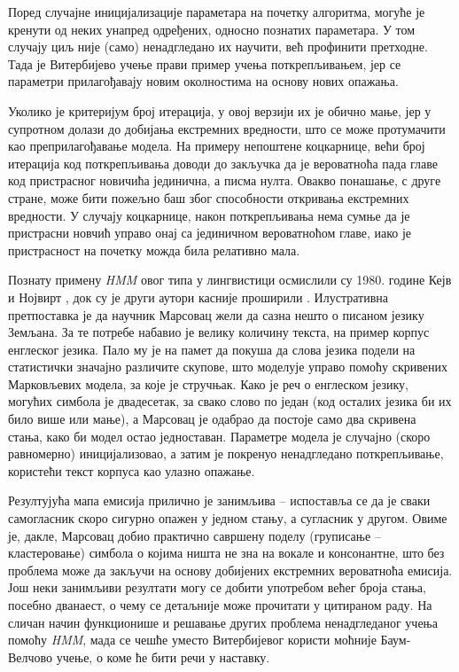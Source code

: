 \documentclass[12pt,oneside]{memoir}
\begin{document}
\begin{CJK}{UTF8}{ipxm}
Поред случајне иницијализације параметара на почетку алгоритма, могуће је кренути од неких унапред одређених, односно познатих параметара. У том случају циљ није (само) ненадгледано их научити, већ профинити претходне. Тада је Витербијево учење прави пример учења поткрепљивањем, јер се параметри прилагођавају новим околностима на основу нових опажања.

Уколико је критеријум број итерација, у овој верзији их је обично мање, јер у супротном долази до добијања екстремних вредности, што се може протумачити као преприлагођавање модела. На примеру непоштене коцкарнице, већи број итерација код поткрепљивања доводи до закључка да је вероватноћа пада главе код пристрасног новичића јединична, а писма нулта. Овакво понашање, с друге стране, може бити пожељно баш због способности откривања екстремних вредности. У случају коцкарнице, након поткрепљивања нема сумње да је пристрасни новчић управо онај са јединичном вероватноћом главе, иако је пристрасност на почетку можда била релативно мала.

Познату примену \textit{HMM} овог типа у лингвистици осмислили су 1980. године Кејв и Нојвирт \cite{cave1980}, док су је други аутори касније проширили \cite{stamp2021}. Илустративна претпоставка је да научник Марсовац жели да сазна нешто о писаном језику Земљана. За те потребе набавио је велику количину текста, на пример корпус енглеског језика. Пало му је на памет да покуша да слова језика подели на статистички значајно различите скупове, што моделује управо помоћу скривених Марковљевих модела, за које је стручњак. Како је реч о енглеском језику, могућих симбола је двадесетак, за свако слово по један (код осталих језика би их било више или мање), а Марсовац је одабрао да постоје само два скривена стања, како би модел остао једноставан. Параметре модела је случајно (скоро равномерно) иницијализовао, а затим је покренуо ненадгледано поткрепљивање, користећи текст корпуса као улазно опажање.

Резултујућа мапа емисија прилично је занимљива -- испоставља се да је сваки самогласник скоро сигурно опажен у једном стању, а сугласник у другом. Овиме је, дакле, Марсовац добио практично савршену поделу (груписање -- кластеровање) симбола о којима ништа не зна на вокале и консонантне, што без проблема може да закључи на основу добијених екстремних вероватноћа емисија. Још неки занимљиви резултати могу се добити употребом већег броја стања, посебно дванаест, о чему се детаљније може прочитати у цитираном раду. На сличан начин функционише и решавање других проблема ненадгледаног учења помоћу \textit{HMM}, мада се чешће уместо Витербијевог користи моћније Баум-Велчово учење, о коме ће бити речи у наставку.


\end{CJK}
\end{document}
